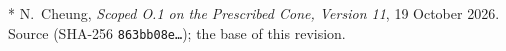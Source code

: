 * N.~Cheung,
\emph{Scoped O.1 on the Prescribed Cone, Version 11},
19 October 2026. Source 
(SHA-256 \texttt{863bb08e\ldots}); the base of this revision.
